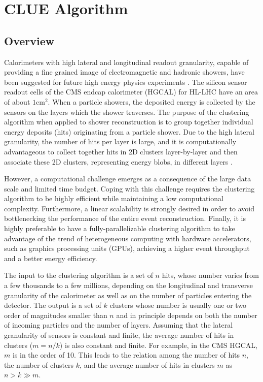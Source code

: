 


\section{CLUE Algorithm}
\label{sec:clue}

\subsection{Overview}
Calorimeters with high lateral and longitudinal readout granularity, capable of providing a fine grained image of electromagnetic and hadronic showers, have been suggested for future high energy physics experiments \cite{calice2012calorimetry}. The  silicon sensor readout cells of the CMS endcap calorimeter (HGCAL) \cite{Collaboration:2293646} for HL-LHC \cite{Apollinari:2284929} have an area of about $1 \mathrm{cm}^2$.
When a particle showers, the deposited energy is collected by the sensors on the layers which the shower traverses. 
The purpose of the clustering algorithm when applied to shower reconstruction is to group together individual energy deposits (hits) originating from a particle shower. Due to the high lateral granularity, the number of hits per layer is large, and it is computationally advantageous to collect together hits in 2D clusters layer-by-layer \cite{Chen:2017btc} and then associate these 2D clusters, representing energy blobs, in different layers \cite{Collaboration:2293646}.



However, a computational challenge emerges as a consequence of the large data scale and limited time budget. %
Coping with this challenge requires the clustering algorithm to be highly efficient while maintaining a low computational complexity. Furthermore, a linear scalability is strongly desired in order to avoid bottlenecking the performance of the entire event reconstruction.  Finally, it is highly preferable to have a fully-parallelizable clustering algorithm to take advantage of the trend of heterogeneous computing with hardware accelerators, such as graphics processing units (GPUs), achieving a higher event throughput and a better energy efficiency.



The input to the clustering algorithm is a set of $n$ hits, whose number varies from a few thousands to a few millions, depending on the longitudinal and transverse granularity of the calorimeter as well as on the number of particles entering the detector. The output is a set of $k$ clusters whose number is usually one or two order of magnitudes smaller than $n$ and in principle depends on both the number of incoming particles and the number of layers. Assuming that the lateral granularity of sensors is constant and finite, the average number of hits in clusters ($m=n/k$) is also constant and finite. For example, in the CMS HGCAL, $m$ is in the order of 10. This leads to the relation among the number of hits $n$, the number of clusters $k$, and the average number of hits in clusters $m$ as $n > k \gg m$.



